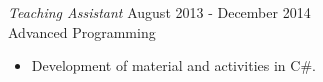 \documentclass[margin, 10pt]{res} %
\begin{document}
\begin{resume}
{\sl Teaching Assistant} \hfill August 2013 - December 2014 \\
Advanced Programming
\begin{itemize}  \itemsep -2pt
\item Development of material and activities in C\#.
\end{itemize}

\end{resume}
\end{document}

